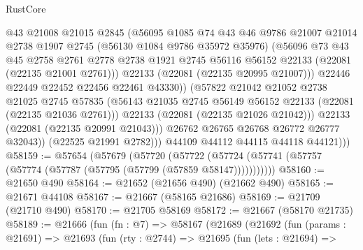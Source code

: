 \begin{lexlean}{RustCore}
\begin{coremodule}
                        @43
                        @21008
                        @21015
                        @2845
                        (@56095
                          @1085
                          @74
                          @43
                          @46
                          @9786
                          @21007
                          @21014
                          @2738
                          @1907
                          @2745
                          (@56130 @1084 @9786 @35972 @35976)
                          (@56096
                            @73
                            @43
                            @45
                            @2758
                            @2761
                            @2778
                            @2738
                            @1921
                            @2745
                            @56116
                            @56152
                            @22133
                            (@22081 (@22135 @21001 @2761)))
                          @22133
                          (@22081 (@22135 @20995 @21007)))
                        @22446
                        @22449
                        @22452
                        @22456
                        @22461
                        @43330))
                    (@57822
                      @21042
                      @21052
                      @2738
                      @21025
                      @2745
                      @57835
                      (@56143 @21035 @2745 @56149 @56152 @22133 (@22081 (@22135 @21036 @2761)))
                      @22133
                      (@22081 (@22135 @21026 @21042)))
                    @22133
                    (@22081 (@22135 @20991 @21043)))
                  @26762
                  @26765
                  @26768
                  @26772
                  @26777
                  @32043))
              (@22525 @21991 @2782)))
          @44109
          @44112
          @44115
          @44118
          @44121)))
@58159 := @57654
    (@57679
      (@57720
        (@57722 (@57724 (@57741 (@57757 (@57774 (@57787 (@57795 (@57799 (@57859 @58147)))))))))))
@58160 := @21650 @490
@58164 := @21652 (@21656 @490) (@21662 @490)
@58165 := @21671 @44108
@58167 := @21667 (@58165 @21686)
@58169 := @21709 (@21710 @490)
@58170 := @21705 @58169
@58172 := @21667 (@58170 @21735)
@58189 := @21666
    (fun (fn : @7) =>
    @58167
      (@21689
        (@21692
          (fun (params : @21691) =>
          @21693
            (fun (rty : @2744) =>
            @21695
              (fun (lets : @21694) =>

\end{coremodule}
\end{lexlean}
